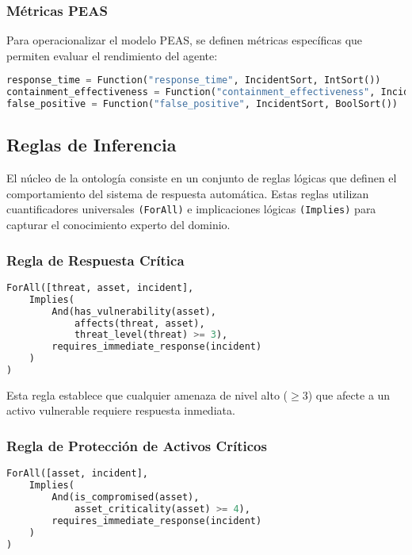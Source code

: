 \subsubsection{Métricas PEAS}

Para operacionalizar el modelo PEAS, se definen métricas específicas que permiten evaluar el rendimiento del agente:

\begin{lstlisting}[language=python, caption={Definición de Métricas PEAS en Z3}, label={lst:peas_metrics}]
response_time = Function("response_time", IncidentSort, IntSort())
containment_effectiveness = Function("containment_effectiveness", IncidentSort, IntSort())
false_positive = Function("false_positive", IncidentSort, BoolSort())
\end{lstlisting}

\subsection{Reglas de Inferencia}

El núcleo de la ontología consiste en un conjunto de reglas lógicas que definen el comportamiento del sistema de respuesta automática. Estas reglas utilizan cuantificadores universales \verb|(ForAll)| e implicaciones lógicas \verb|(Implies)| para capturar el conocimiento experto del dominio.

\subsubsection{Regla de Respuesta Crítica}

\begin{lstlisting}[language=python, caption={Regla de Respuesta Crítica en Z3}, label={lst:critical_response}]
ForAll([threat, asset, incident],
    Implies(
        And(has_vulnerability(asset),
            affects(threat, asset),
            threat_level(threat) >= 3),
        requires_immediate_response(incident)
    )
)
\end{lstlisting}

Esta regla establece que cualquier amenaza de nivel alto ($\geq$3) que afecte a un activo vulnerable requiere respuesta inmediata.

\subsubsection{Regla de Protección de Activos Críticos}

\begin{lstlisting}[language=python, caption={Regla de Protección de Activos Críticos en Z3}, label={lst:protect_critical_assets}]
ForAll([asset, incident],
    Implies(
        And(is_compromised(asset), 
            asset_criticality(asset) >= 4),
        requires_immediate_response(incident)
    )
)
\end{lstlisting}

